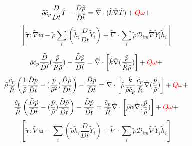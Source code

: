 \documentclass[preprint,12pt,authoryear]{elsarticle}
\begin{document}



{\color{red}
\[
         \tilde{\rho} \tilde{c}_{p}
        \frac{D}{Dt}
		\tilde{T}
		-
		 \frac{\tilde{D} \tilde{p}}{\tilde{D}\tilde{t}}
		=
		\tilde{\nabla} \cdot (\tilde{k}\tilde{\nabla} \tilde{T})
                +
        {\color{red} Q\omega}
        +
\]
\[
        \left[
        \pmb{\tilde{\tau}}:\tilde{\nabla} \tilde{\mathbf{u}} 
        -
         \tilde{\rho}
        \sum\limits_i
        \left(
                \tilde{h}_i
                \frac{D}{Dt}
		\tilde{Y}_i
		\right)
        +
        \tilde{\nabla} \cdot
        \sum\limits_i 
        \tilde{\rho}\mathcal{D}_{im}\tilde{\nabla}\tilde{Y}_i     
        \tilde{h}_i
        \right]
\]

\[
         \tilde{\rho} \tilde{c}_{p}
         \frac{\tilde{D} } {\tilde{D}\tilde{t}}
		(\frac{ \tilde{p} }{ \tilde{R} \tilde{\rho} } )
		-
		 \frac{\tilde{D} \tilde{p}}{\tilde{D}\tilde{t}}
		=
		\tilde{\nabla} \cdot 
		\left[\tilde{k}\tilde{\nabla} (\frac{ \tilde{p} }{ \tilde{R} \tilde{\rho} } )\right]
                +
        {\color{red} Q\omega}
        +
\]
\[
         \tilde{\rho} \frac{ \tilde{c}_{p} }{ \tilde{R} }
         \left(
         \frac{ 1 }{  \tilde{\rho} }
         \frac{\tilde{D}  \tilde{p}} {\tilde{D}\tilde{t}}
		-
		(\frac{ \tilde{p} }{  \tilde{\rho}^2 } )
		 \frac{\tilde{D}\tilde{\rho} } {\tilde{D}\tilde{t}}
		\right)
		-
		 \frac{\tilde{D} \tilde{p}}{\tilde{D}\tilde{t}}
		=
		\tilde{\nabla} \cdot
		\left[ \tilde{\rho} 
		       \frac{\tilde{k}}{\tilde{\rho} \tilde{c}_{p} }
		       \frac{\tilde{c}_{p}}{\tilde{R}}
		\tilde{\nabla} (\frac{ \tilde{p} }{  \tilde{\rho} } )\right]
                +
        {\color{red} Q\omega}
        +
\]
\[
          \frac{ \tilde{c}_{p} }{ \tilde{R} }
         \left(
         \frac{\tilde{D}  \tilde{p}} {\tilde{D}\tilde{t}}
		-
		(\frac{ \tilde{p} }{  \tilde{\rho} } )
		 \frac{\tilde{D}\tilde{\rho} } {\tilde{D}\tilde{t}}
		\right)
		-
		 \frac{\tilde{D} \tilde{p}}{\tilde{D}\tilde{t}}
		=
		\frac{\tilde{c}_{p}}{\tilde{R}}
		\tilde{\nabla} \cdot 
			\left[ \tilde{\rho} \alpha
		\tilde{\nabla} (\frac{ \tilde{p} }{  \tilde{\rho} } )\right]
                +
        {\color{red} Q\omega}
        +
\]
\[
        \left[
        \pmb{\tilde{\tau}}:\tilde{\nabla} \tilde{\mathbf{u}} 
        -
        \sum\limits_i
        \left(
                 \tilde{\rho}\tilde{h}_i
                \frac{D}{Dt}
		\tilde{Y}_i
		\right)
        +
        \tilde{\nabla} \cdot
        \sum\limits_i 
        \tilde{\rho}\mathcal{D}_{im}\tilde{\nabla}\tilde{Y}_i     
        \tilde{h}_i
        \right]
\]

}
\end{document}
